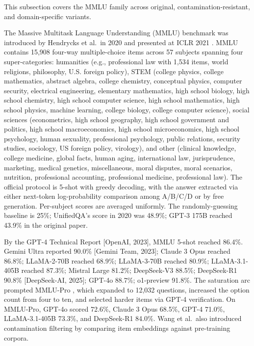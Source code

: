 \documentclass{article}
\begin{document}
This subsection covers the MMLU family across original, contamination-resistant, and domain-specific variants.

The Massive Multitask Language Understanding (MMLU) benchmark was introduced by Hendrycks et al.~in 2020 and presented at ICLR 2021 \cite{hendrycks2021measuringmassivemu}. MMLU contains 15,908 four-way multiple-choice items across 57 subjects spanning four super-categories: humanities (e.g., professional law with 1,534 items, world religions, philosophy, U.S. foreign policy), STEM (college physics, college mathematics, abstract algebra, college chemistry, conceptual physics, computer security, electrical engineering, elementary mathematics, high school biology, high school chemistry, high school computer science, high school mathematics, high school physics, machine learning, college biology, college computer science), social sciences (econometrics, high school geography, high school government and politics, high school macroeconomics, high school microeconomics, high school psychology, human sexuality, professional psychology, public relations, security studies, sociology, US foreign policy, virology), and other (clinical knowledge, college medicine, global facts, human aging, international law, jurisprudence, marketing, medical genetics, miscellaneous, moral disputes, moral scenarios, nutrition, professional accounting, professional medicine, professional law). The official protocol is 5-shot with greedy decoding, with the answer extracted via either next-token log-probability comparison among A/B/C/D or by free generation. Per-subject scores are averaged uniformly. The randomly-guessing baseline is 25\%; UnifiedQA's score in 2020 was 48.9\%; GPT-3 175B reached 43.9\% in the original paper.

By the GPT-4 Technical Report {[}OpenAI, 2023{]}, MMLU 5-shot reached 86.4\%. Gemini Ultra reported 90.0\% {[}Gemini Team, 2023{]}; Claude 3 Opus reached 86.8\%; LLaMA-2-70B reached 68.9\%; LLaMA-3-70B reached 80.9\%; LLaMA-3.1-405B reached 87.3\%; Mistral Large 81.2\%; DeepSeek-V3 88.5\%; DeepSeek-R1 90.8\% {[}DeepSeek-AI, 2025{]}; GPT-4o 88.7\%; o1-preview 91.8\%. The saturation arc prompted MMLU-Pro \cite{wang20242024}, which expanded to 12,032 questions, increased the option count from four to ten, and selected harder items via GPT-4 verification. On MMLU-Pro, GPT-4o scored 72.6\%, Claude 3 Opus 68.5\%, GPT-4 71.0\%, LLaMA-3.1-405B 73.3\%, and DeepSeek-R1 84.0\%. Wang et al.~also introduced contamination filtering by comparing item embeddings against pre-training corpora.
\end{document}
